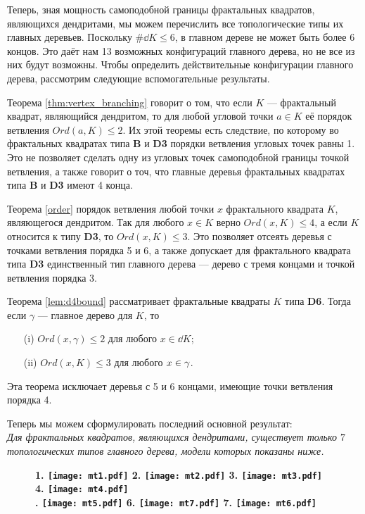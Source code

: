 Теперь, зная мощность самоподобной границы фрактальных квадратов, являющихся дендритами, мы можем перечислить все топологические типы их главных деревьев.
Поскольку $\#\dd K\leq6$,  в главном дереве не может быть более 6 концов.
Это даёт нам 13 возможных конфигураций главного дерева, но не все из них будут возможны.
Чтобы определить действительные конфигурации главного дерева, рассмотрим следующие вспомогательные результаты.

Теорема \ref{thm:vertex_branching} говорит о том, что если $K$ --- фрактальный квадрат, являющийся дендритом, то для любой угловой точки $a\in K$ её порядок ветвления $Ord(a,K)\leq 2$.
Их этой теоремы есть следствие, по которому во фрактальных квадратах типа {\bf B} и {\bf D3} порядки ветвления угловых точек равны 1.
Это не позволяет сделать одну из угловых точек самоподобной границы точкой ветвления, а также говорит о точ, что главные деревья фрактальных квадратах типа {\bf B} и {\bf D3} имеют 4 конца.

Теорема \ref{order} порядок ветвления любой точки $x$ фрактального квадрата $K$, являющегося дендритом.
Так для любого  $x\in K$ верно $Ord(x,K)\le 4$, а если $K$ относится к типу {\bf D3}, то $Ord(x, K)\le 3$.
Это позволяет отсеять деревья с точками ветвления порядка 5 и 6, а также допускает для фрактального квадрата типа {\bf D3} единственный тип главного дерева --- дерево с тремя концами и точкой ветвления порядка 3.

Теорема \ref{lem:d4bound} рассматривает фрактальные квадраты $K$ типа {\bf D6}.
Тогда если $\gamma$ ---  главное дерево для $K$, то
\begin{itemize}[nolistsep]
    \item[(i)] $Ord(x,\gamma)\leq2$ для любого $x\in\dd K$;
    \item[(ii)] $Ord(x,K)\leq3$ для любого $x\in\gamma$.
\end{itemize}
Эта теорема исключает деревья с 5 и 6 концами, имеющие точки ветвления порядка 4.

Теперь мы можем сформулировать последний основной результат:\\

{\em Для фрактальных квадратов, являющихся дендритами, существует только $7$ топологических типов главного дерева, модели которых показаны ниже.}
\begin{figure}[H]
    \centering \Large {\bf
    1. \texttt{[image: mt1.pdf]}
    \hfill
    2. \texttt{[image: mt2.pdf]}
    \hfill
    3. \texttt{[image: mt3.pdf]}
    \hfill
    4. \texttt{[image: mt4.pdf]}\\
    . \texttt{[image: mt5.pdf]}
    \hfill
    6. \texttt{[image: mt7.pdf]}
    \hfill
    7. \texttt{[image: mt6.pdf]}}
\end{figure}

